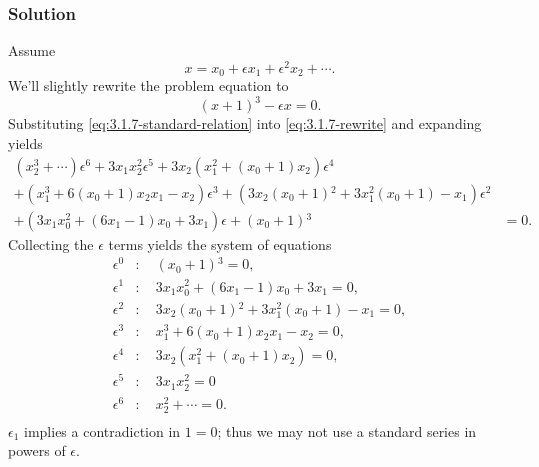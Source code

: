\documentclass[12pt,twoside]{article}
\begin{document}
\subsubsection*{Solution}
Assume
\begin{equation}
  \label{eq:3.1.7-standard-relation}
  x=x_0+\epsilon x_1 + \epsilon^2x_2+\cdots.
\end{equation}
We'll slightly rewrite the problem equation to
\begin{equation}
  \label{eq:3.1.7-rewrite}
  {(x+1)}^3-\epsilon x=0.
\end{equation}
Substituting \cref{eq:3.1.7-standard-relation} into \cref{eq:3.1.7-rewrite} and expanding
yields
\begin{equation*}
  \label{eq:3.1.7-bad-eq}
  \begin{split}
    (x_2^3+\cdots) \epsilon ^6+3 x_1 x_2^2 \epsilon ^5+3 x_2 \left(x_1^2+\left(x_0+1\right)
      x_2\right) \epsilon ^4 \\
    +\left(x_1^3+6 \left(x_0+1\right) x_2 x_1-x_2\right) \epsilon ^3
    +\left(3 x_2 \left(x_0+1\right){}^2+3 x_1^2 \left(x_0+1\right)-x_1\right)
    \epsilon ^2 \\
    +\left(3 x_1 x_0^2+\left(6 x_1-1\right) x_0+3 x_1\right)
    \epsilon +\left(x_0+1\right){}^3&=0.
  \end{split}
\end{equation*}
Collecting the $\epsilon$ terms yields the system of equations
\begin{align*}
  \label{eq:3.1.7-bad-system}
  \epsilon^0 &:\quad \left(x_0+1\right){}^3=0, \\
  \epsilon^1 &:\quad 3 x_1 x_0^2+\left(6 x_1-1\right) x_0+3 x_1=0, \\
  \epsilon^2 &:\quad 3 x_2 \left(x_0+1\right){}^2+3 x_1^2 \left(x_0+1\right)-x_1=0, \\
  \epsilon^3 &:\quad x_1^3+6 \left(x_0+1\right) x_2 x_1-x_2=0, \\
  \epsilon^4 &:\quad 3 x_2 \left(x_1^2+\left(x_0+1\right) x_2\right)=0, \\
  \epsilon^5 &:\quad 3 x_1 x_2^2=0 \\
  \epsilon^6 &:\quad x_2^2+\cdots = 0. \\
\end{align*}
$\epsilon_1$ implies a contradiction in $1=0$; thus we may not use a standard
series in powers of $\epsilon$.
\end{document}
